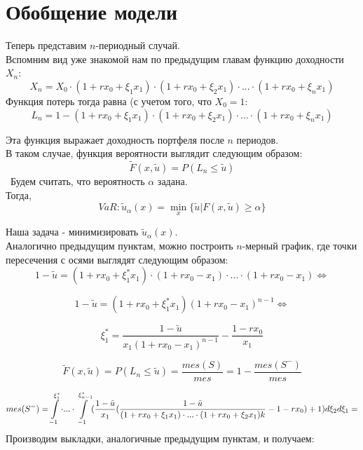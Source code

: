 \documentclass[18pt,a4paper]{article}
\theoremstyle{plain}
\theoremstyle{definition}
\begin{document}
\centering\section{Обобщение модели}
\flushleft

Теперь представим $n$-периодный случай.\\
Вспомним вид уже знакомой нам по предыдущим главам функцию доходности $X_n$:
$$
X_n = X_0 \cdot (1+rx_0+\xi_1 x_1) \cdot (1+rx_0+\xi_2 x_1) \cdot ... \cdot (1+rx_0+\xi_n x_1)
$$
Функция потерь тогда равна (с учетом того, что $X_0 = 1$:\\
$$
L_n = 1 - (1+rx_0+\xi_1 x_1) \cdot (1+rx_0+\xi_2 x_1) \cdot ... \cdot (1+rx_0+\xi_n x_1)
$$

Эта функция выражает доходность портфеля после $n$ периодов.\\
В таком случае, функция вероятности выглядит следующим образом:\\
$$
\tilde{F}(x,\tilde{u}) = P(L_n \le \tilde{u})
$$\
Будем считать, что вероятность $\alpha$ задана.\\
Тогда,\\
$$
VaR: \tilde{u}_\alpha (x) = \min\limits_{x} \{\tilde{u}|F(x,\tilde{u})\ge \alpha\}
$$

Наша задача - минимизировать $\tilde{u}_\alpha (x)$.\\
Аналогично предыдущим пунктам, можно построить $n$-мерный график, где точки пересечения с осями выглядят следующим образом:
$$
1-\tilde{u} = (1+rx_0 + \xi^*_1 x_1) \cdot (1+rx_0- x_1) \cdot ... \cdot (1+rx_0- x_1) \Longleftrightarrow
$$

$$
1-\tilde{u} = (1+rx_0 + \xi^*_1 x_1)  (1+rx_0- x_1)^{n-1} \Longleftrightarrow
$$

$$
\xi^*_1 = \frac{1-\tilde{u}}{x_1(1+rx_0- x_1)^{n-1}} -\frac{1 - rx_0}{x_1}
$$

$$
\tilde{F}(x,\tilde{u})=P(L_n \le \tilde{u}) = \frac{mes(S)}{mes} = 1 - \frac{mes(S^-)}{mes}
$$


$$
mes(S^-) = \int\displaylimits_{-1}^{\xi_1^*} \cdot ... \cdot   \int\displaylimits_{-1}^{\xi_{n-1}^*} (\frac{1-\tilde{u}}{x_1} (\frac{1-\tilde{u}}{(1+rx_0+\xi_1 x_1)\cdot ... \cdot (1+rx_0+\xi_2 x_1)k} -1 -rx_0)+1 )d\xi_2 d\xi_1 =
$$
Производим выкладки, аналогичные предыдущим пунктам, и получаем:
\end{document}

